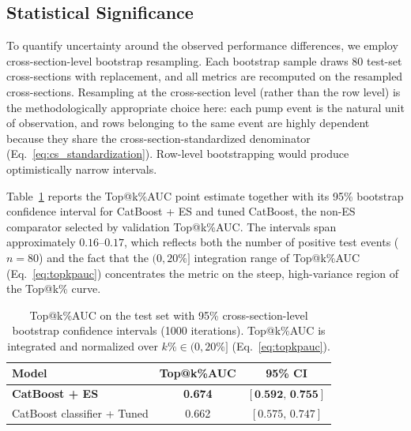 \documentclass{ieeeaccess}
\begin{document}
\subsection{Statistical Significance}
\label{sec:significance}

To quantify uncertainty around the observed performance differences, we employ cross-section-level bootstrap resampling. Each bootstrap sample draws 80 test-set cross-sections with replacement, and all metrics are recomputed on the resampled cross-sections. Resampling at the cross-section level (rather than the row level) is the methodologically appropriate choice here: each pump event is the natural unit of observation, and rows belonging to the same event are highly dependent because they share the cross-section-standardized denominator (Eq.~\ref{eq:cs_standardization}). Row-level bootstrapping would produce optimistically narrow intervals.

Table~\ref{table:significance_ci} reports the Top@k\%AUC point estimate together with its 95\% bootstrap confidence interval for CatBoost + ES and tuned CatBoost, the non-ES comparator selected by validation Top@k\%AUC. The intervals span approximately $0.16$--$0.17$, which reflects both the number of positive test events ($n = 80$) and the fact that the $(0, 20\%]$ integration range of Top@k\%AUC (Eq.~\ref{eq:topkpauc}) concentrates the metric on the steep, high-variance region of the Top@k\% curve.

\begin{table}[!t]
    \centering
    \setlength{\tabcolsep}{6pt}
    \renewcommand{\arraystretch}{1.2}
    \caption{Top@k\%AUC on the test set with 95\% cross-section-level bootstrap confidence intervals (1000 iterations). Top@k\%AUC is integrated and normalized over $k\% \in (0, 20\%]$ (Eq.~\ref{eq:topkpauc}).}
    \begin{tabular}{lcc}
        \toprule
        Model & Top@k\%AUC & 95\% CI \\
        \midrule
        \textbf{CatBoost + ES} & \textbf{0.674} & $[\textbf{0.592},\,\textbf{0.755}]$ \\
        CatBoost classifier + Tuned & 0.662 & $[0.575,\,0.747]$ \\
        \bottomrule
    \end{tabular}
    \label{table:significance_ci}
\end{table}
\end{document}
